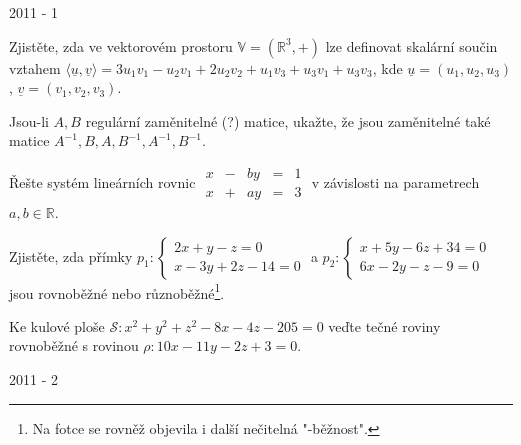 
\newpage
{\large 2011 - 1}

\begin{questions}

\question Zjistěte, zda ve vektorovém prostoru \(\mathbb{V} = (\mathbb{R}^3, +)\) lze definovat skalární součin vztahem \( \langle \underline{u}, \underline{v} \rangle = 3u_1v_1 - u_2v_1 + 2u_2v_2 + u_1v_3 + u_3v_1 + u_3v_3 \), kde \(\underline{u} = (u_1, u_2, u_3)\), \(\underline{v} = (v_1, v_2, v_3)\).

\question Jsou-li \(A, B\) regulární zaměnitelné (?) matice, ukažte, že jsou zaměnitelné také matice \(A^{-1}, B, A, B^{-1}, A^{-1}, B^{-1}\).

\newpage

\question Řešte systém lineárních rovnic \(\begin{matrix}
    x & - & by & = & 1\\
    x & + & ay & = & 3
\end{matrix}\) v závislosti na parametrech \(a, b \in \mathbb{R}\).

\question Zjistěte, zda přímky \(p_1: \left\{
    \begin{array}{l}
        2x+y-z =0\\
        x-3y+2z-14 =0
    \end{array}
\right.\) a \(p_2: \left\{
    \begin{array}{l}
        x+5y-6z+34 = 0\\
        6x-2y-z-9=0
    \end{array}
\right.\) jsou rovnoběžné nebo různoběžné\footnote{Na fotce se rovněž objevila i další nečitelná "-běžnost".}.

\newpage

\question Ke kulové ploše \(\mathcal{S}: x^2 + y^2 + z^2 - 8x - 4z - 205 = 0\) veďte tečné roviny rovnoběžné s rovinou \(\rho: 10x - 11y - 2z + 3 = 0\).
\end{questions}

\newpage
{\large 2011 - 2}
